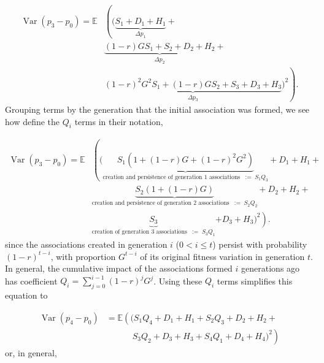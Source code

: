 \documentclass[11pt]{article}
\newcommand{\nnn}{\nonumber}
\newcommand{\E}{\mathbb{E}}
\DeclareMathOperator{\var}{Var}
\DeclareMathOperator{\cov}{Cov}
\begin{document}
\begin{align}
  \var(p_3 - p_0) = \E & \left( \bigg( \underbrace{S_1 + D_1 + H_1}_{\Delta p_1} + \right. \nonumber \\
                             & \underbrace{ (1-r) G S_1 + S_2 + D_2 + H_2}_{\Delta p_2} + \nonumber \\
                             & \left.  \underbrace{ (1-r)^2 G^2 S_1 + (1-r) G S_2 + S_3 + D_3 + H_3}_{\Delta p_3} \bigg)^2 \right).
    \label{eq:sc-var4}
\end{align}
%
Grouping terms by the generation that the initial association was formed, we
see how \textcite{Santiago1995-hx} define the $Q_i$ terms in their notation,

\begin{align}
  \var(p_3 - p_0) = \E & \left( \bigg( \underbrace{S_1(1 + (1-r) G + (1-r)^2 G^2)}_{\text{creation and persistence of generation 1 associations} \;\; := \; S_1 Q_3} \right. +  D_1 + H_1+ \nonumber \\
                       & \underbrace{S_2(1 + (1-r) G)}_{\text{creation and persistence of generation 2 associations} \;\; := \; S_2 Q_2}+ D_2 + H_2 + \nonumber \\
                       &  \underbrace{S_3}_{\text{creation of generation 3 associations} \;\; := \; S_3 Q_1  }\left. + D_3 + H_3 \bigg)^2 \right). &
    \label{eq:scr-var2}
\end{align}
%
since the associations created in generation $i$ ($ 0 < i \le t$) persist with
probability $(1-r)^{t-i}$, with proportion $G^{t-i}$ of its original fitness
variation in generation $t$. In general, the cumulative impact of the
associations formed $i$ generations ago has coefficient $Q_i =
\sum_{j=0}^{i-1} (1-r)^j G^j$. Using these $Q_i$ terms simplifies this equation
to

\begin{align}
  \var(p_4 - p_0) &= \E \left( \bigg(  S_1 Q_4 + D_1 + H_1 + S_2 Q_3 + D_2 + H_2 + \right. \nonumber \\
                  & \;\;\;\;\;\;\;\;\;\;\; \left. S_3 Q_2 + D_3 + H_3 + S_4 Q_1 + D_4 + H_4 \bigg)^2 \right)
\end{align}
%
or, in general,
\end{document}
